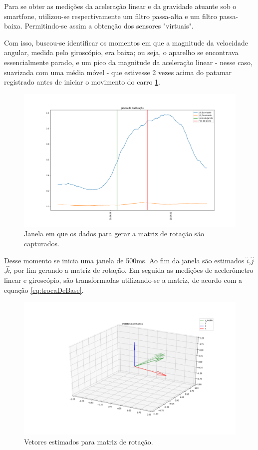 Para se obter as medições da aceleração linear e da gravidade atuante sob o smartfone, utilizou-se respectivamente um filtro passa-alta e um filtro passa-baixa. Permitindo-se assim a obtenção dos sensores "virtuais".

Com isso, buscou-se identificar os momentos em que a magnitude da velocidade angular, medida pelo giroscópio, era baixa; ou seja, o aparelho se encontrava essencialmente parado, e um pico da magnitude da aceleração linear - nesse caso, suavizada com uma média móvel - que estivesse 2 vezes acima do patamar registrado antes de iniciar o movimento do carro \ref{fig:janelaCalibracao}.

\begin{figure}
    \centering
    \includegraphics[width=150mm]{Figuras/janelaCalibracao.png}
    \caption{Janela em que os dados para gerar a matriz de rotação são capturados.}
    \label{fig:janelaCalibracao}
\end{figure}

Desse momento se inicia uma janela de 500ms. Ao fim da janela são estimados $\hat{i}$,$\hat{j}$,$\hat{k}$, por fim gerando a matriz de rotação. Em seguida as medições de acelerômetro linear e giroscópio, são transformadas utilizando-se a matriz, de acordo com a equação \eqref{eq:trocaDeBase}.

\begin{figure}[H]
    \centering
    \includegraphics[width=150mm]{Figuras/vetoresEstimados.png}
    \caption{Vetores estimados para matriz de rotação.}
    \label{fig:vetoresEstimados}
\end{figure}{}

